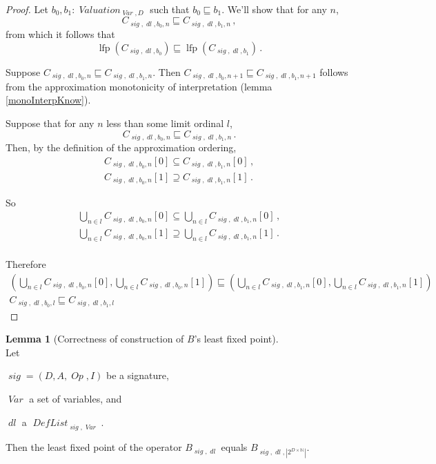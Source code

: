 \documentclass[oneside,12pt]{book}
\theoremstyle{definition}
\newtheorem{lemma}[theorem]{Lemma}
\theoremstyle{remark}
\newcommand\var[1]{\mathop{\mathit{#1}}\nolimits}
\newcommand{\approximates}{\sqsubseteq}
\newcommand{\sig}{\var{sig}}
\newcommand{\Op}{\var{Op}}
\newcommand{\Var}{\var{Var}}
\DeclareMathOperator{\lfp}{lfp}
\newcommand{\Valuation}{\var{Valuation}}
\newcommand{\DefList}{\var{DefList}}
\newcommand{\dl}{\var{dl}}
\begin{document}
\begin{proof}
  Let $b_0, b_1\colon \Valuation_{\Var,D}$ such that $b_0 \approximates b_1$.
  We'll show that for any $n$,
  \[C_{\sig,\dl,b_0,n} \approximates C_{\sig,\dl,b_1,n}\,,\]
  from which it follows that
  \[\lfp(C_{\sig,\dl,b_0}) \approximates \lfp(C_{\sig,\dl,b_1})\,.\]
  
  Suppose $C_{\sig,\dl,b_0,n} \approximates C_{\sig,\dl,b_1,n}$. Then
  $C_{\sig,\dl,b_0,n+1} \approximates C_{\sig,\dl,b_1,n+1}$ follows from
  the approximation monotonicity of interpretation (lemma \ref{monoInterpKnow}).
  
  Suppose that for any $n$ less than some limit ordinal $l$,
  \[C_{\sig,\dl,b_0,n} \approximates C_{\sig,\dl,b_1,n}\,.\]
  Then, by the definition of the approximation ordering,
  \begin{gather*}
    C_{\sig,\dl,b_0,n}[0] \subseteq C_{\sig,\dl,b_1,n}[0]\,,\\
    C_{\sig,\dl,b_0,n}[1] \supseteq C_{\sig,\dl,b_1,n}[1]\,.
  \end{gather*}
  
  So
  \begin{gather*}
    \bigcup_{n \in l}C_{\sig,\dl,b_0,n}[0] \subseteq
      \bigcup_{n \in l}C_{\sig,\dl,b_1,n}[0]\,,\\
    \bigcup_{n \in l}C_{\sig,\dl,b_0,n}[1] \supseteq
      \bigcup_{n \in l}C_{\sig,\dl,b_1,n}[1]\,.\\
  \end{gather*}
  
  Therefore
  \begin{gather*}
    (\bigcup_{n \in l}C_{\sig,\dl,b_0,n}[0], \bigcup_{n \in l}C_{\sig,\dl,b_0,n}[1])
      \approximates
    (\bigcup_{n \in l}C_{\sig,\dl,b_1,n}[0], \bigcup_{n \in l}C_{\sig,\dl,b_1,n}[1])\\
    C_{\sig,\dl,b_0,l} \approximates C_{\sig,\dl,b_1,l}
  \end{gather*}
\end{proof}

\begin{lemma}[Correctness of construction of $B$'s least fixed point] \hfill \\
  Let
  \begin{compactitem}
    \item $\sig = (D, A, \Op, I)$ be a signature,
    \item $\Var$ a set of variables, and
    \item $\dl$ a $\DefList_{\sig,\Var}$.
  \end{compactitem}
  
  \medskip \noindent Then the least fixed point of the operator $B_{\sig,\dl}$
  equals $B_{\sig,\dl,|2^{D \times \mathbb{N}}|}$.
\end{lemma}
\end{document}
